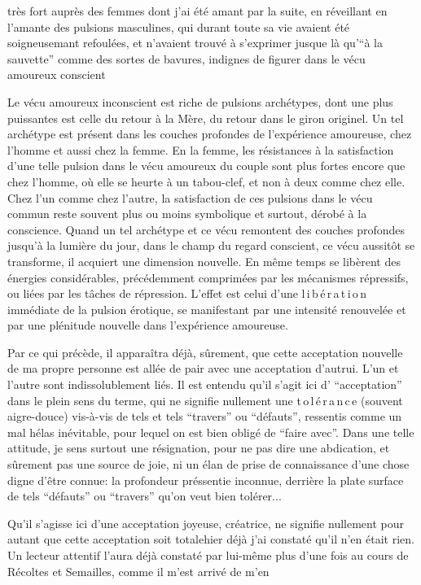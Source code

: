 
très fort auprès des femmes dont j'ai été amant par la suite, en réveillant en l'amante des pulsions masculines, qui durant toute sa vie avaient été soigneusemant refoulées, et n'avaient trouvé à s'exprimer jusque là qu'``à la sauvette'' comme des sortes de bavures, indignes de figurer dans le vécu amoureux conscient

Le vécu amoureux inconscient est riche de pulsions archétypes, dont une  plus puissantes est celle du retour à la Mère, du retour dans le giron originel. Un tel archétype est présent dans les couches profondes de l'expérience amoureuse, chez l'homme et aussi chez la femme. En la femme, les résistances à la satisfaction d'une telle pulsion dans le vécu amoureux du couple sont plus fortes encore que chez l'homme, où elle se heurte à un tabou-clef, et non à deux comme chez elle. Chez l'un comme chez l'autre, la satisfaction de ces pulsions \unsure{\textperiodcentered|}dans le vécu commun reste souvent plus ou moins symbolique et surtout, dérobé à la conscience. Quand un tel archétype et ce vécu remontent des couches profondes jusqu'à la lumière du jour, dans le champ du regard conscient, ce vécu aussitôt se transforme, il acquiert une dimension nouvelle. En même temps se libèrent des énergies considérables, précédemment comprimées par les mécanismes répressifs, ou liées par les tâches de répression. L'effet est celui d'une l\,i\,b\,é\,r\,a\,t\,i\,o\,n immédiate de la pulsion érotique, se manifestant par une intensité renouvelée et par une plénitude nouvelle dans l'expérience amoureuse.

Par ce qui précède, il apparaîtra déjà, sûrement, que cette acceptation nouvelle de ma propre personne est allée de pair avec une acceptation d'autrui. L'un et l'autre sont indissolublement liés. Il est entendu qu'il s'agit ici d' ``acceptation'' dans le plein sens du terme, qui ne signifie nullement une t\,o\,l\,é\,r\,a\,n\,c\,e (souvent aigre-douce) vis-à-vis de tels et tels ``travers'' ou ``défauts'', ressentis comme un mal hélas inévitable, pour lequel on est bien obligé de ``faire avec''. Dans une telle attitude, je sens surtout une résignation, pour ne pas dire une abdication, et sûrement pas une source de joie, ni un élan de prise de connaissance d'une chose digne d'être connue: la profondeur préssentie\handwritten{,} inconnue, derrière la plate surface de tels ``défauts'' ou ``travers'' qu'on veut bien tolérer...

Qu'il s'agisse ici d'une acceptation joyeuse, créatrice, ne signifie nullement pour autant que cette acceptation soit totale\handwritten{-}hier déjà j'ai constaté qu'il n'en était rien. Un lecteur attentif l'aura déjà constaté par lui-même plus d'une fois au cours de Récoltes et Semailles, comme il m'est arrivé de m'en

